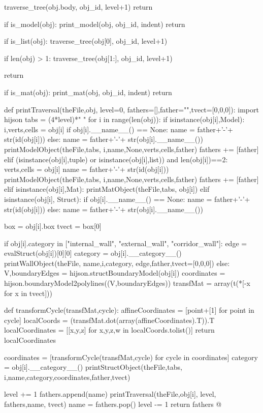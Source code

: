 \documentclass[11pt,oneside]{article}    %
\begin{document}
{		traverse_tree(obj.body, obj_id, level+1)
		return

	if is_model(obj):
		print_model(obj, obj_id, indent)
		return

	if is_list(obj):			
		traverse_tree(obj[0], obj_id, level+1)
		
		if len(obj) > 1:
			traverse_tree(obj[1:], obj_id, level+1)
	
		return
	
	if is_mat(obj):
		print_mat(obj, obj_id, indent)
		return
   
   
def printTraversal(theFile,obj, level=0, fathers=[],father="",tvect=[0,0,0]):
   import hijson
   tabs = (4*level)*" "
   for i in range(len(obj)):
      if isinstance(obj[i],Model): 
         i,verts,cells = obj[i]
         if obj[i].__name__() == None:
            name = father+'-'+ str(id(obj[i]))
         else: 
            name = father+'-'+ str(obj[i].__name__())
         printModelObject(theFile,tabs, i,name,None,verts,cells,father)
         fathers += [father]
      elif (isinstance(obj[i],tuple) or isinstance(obj[i],list)) and len(obj[i])==2:
         verts,cells = obj[i]
         name = father+'-'+ str(id(obj[i]))
         printModelObject(theFile,tabs, i,name,None,verts,cells,father)
         fathers += [father]
      elif isinstance(obj[i],Mat): 
         printMatObject(theFile,tabs, obj[i])
      elif isinstance(obj[i], Struct):
         if obj[i].__name__() == None:
            name = father+'-'+ str(id(obj[i]))
         else: 
            name = father+'-'+ str(obj[i].__name__())
            
         box = obj[i].box
         tvect = box[0]
         
         if obj[i].category in ["internal_wall", "external_wall", "corridor_wall"]:
             edge = evalStruct(obj[i])[0][0]
             category = obj[i].__category__()
             printWallObject(theFile, name,i,category, edge,father,tvect=[0,0,0])
         else:        
             V,boundaryEdges = hijson.structBoundaryModel(obj[i])   
             coordinates = hijson.boundaryModel2polylines((V,boundaryEdges))
             transfMat = array(t(*[-x for x in tvect]))
             
             def transformCycle(transfMat,cycle):
                 affineCoordinates = [point+[1] for point in cycle]
                 localCoords = (transfMat.dot(array(affineCoordinates).T)).T
                 localCoordinates = [[x,y,z] for x,y,z,w in localCoords.tolist()]
                 return localCoordinates
                 
             coordinates = [transformCycle(transfMat,cycle) for cycle in coordinates]
             category = obj[i].__category__()
             printStructObject(theFile,tabs, i,name,category,coordinates,father,tvect)
             
         level += 1
         fathers.append(name)
         printTraversal(theFile,obj[i], level, fathers,name, tvect)
         name = fathers.pop()
         level -= 1
   return fathers
@}
\end{document}
